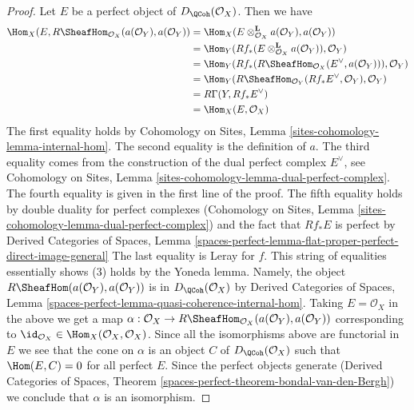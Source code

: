 \begin{proof}
\medskip\noindent
Let $E$ be a perfect object of $D_\QCoh(\mathcal{O}_X)$. Then
we have
\begin{align*}
\Hom_X(E, R\SheafHom_{\mathcal{O}_X}(a(\mathcal{O}_Y), a(\mathcal{O}_Y))
& =
\Hom_X(E \otimes_{\mathcal{O}_X}^\mathbf{L} a(\mathcal{O}_Y),
a(\mathcal{O}_Y)) \\
& =
\Hom_Y(Rf_*(E \otimes_{\mathcal{O}_X}^\mathbf{L} a(\mathcal{O}_Y)),
\mathcal{O}_Y) \\
& =
\Hom_Y(Rf_*(R\SheafHom_{\mathcal{O}_X}(E^\vee, a(\mathcal{O}_Y))),
\mathcal{O}_Y) \\
& =
\Hom_Y(R\SheafHom_{\mathcal{O}_Y}(Rf_*E^\vee, \mathcal{O}_Y),
\mathcal{O}_Y) \\
& =
R\Gamma(Y, Rf_*E^\vee) \\
& =
\Hom_X(E, \mathcal{O}_X)
\end{align*}
The first equality holds by Cohomology on Sites, Lemma
\ref{sites-cohomology-lemma-internal-hom}.
The second equality is the definition of $a$.
The third equality comes from the construction of the dual perfect
complex $E^\vee$, see Cohomology on Sites, Lemma
\ref{sites-cohomology-lemma-dual-perfect-complex}.
The fourth equality is given in the first line of the proof.
The fifth equality holds by double duality for perfect complexes
(Cohomology on Sites, Lemma
\ref{sites-cohomology-lemma-dual-perfect-complex})
and the fact that $Rf_*E$ is perfect by
Derived Categories of Spaces, Lemma
\ref{spaces-perfect-lemma-flat-proper-perfect-direct-image-general}
The last equality is Leray for $f$.
This string of equalities essentially shows (3)
holds by the Yoneda lemma. Namely, the object
$R\SheafHom(a(\mathcal{O}_Y), a(\mathcal{O}_Y))$
is in $D_\QCoh(\mathcal{O}_X)$ by Derived Categories of Spaces, Lemma
\ref{spaces-perfect-lemma-quasi-coherence-internal-hom}.
Taking $E = \mathcal{O}_X$ in the above we get a map
$\alpha : \mathcal{O}_X \to
R\SheafHom_{\mathcal{O}_X}(a(\mathcal{O}_Y), a(\mathcal{O}_Y))$
corresponding to
$\id_{\mathcal{O}_X} \in \Hom_X(\mathcal{O}_X, \mathcal{O}_X)$.
Since all the isomorphisms above are functorial in $E$ we
see that the cone on $\alpha$ is an object $C$ of $D_\QCoh(\mathcal{O}_X)$
such that $\Hom(E, C) = 0$ for all perfect $E$.
Since the perfect objects generate
(Derived Categories of Spaces, Theorem
\ref{spaces-perfect-theorem-bondal-van-den-Bergh})
we conclude that $\alpha$ is an isomorphism.
\end{proof}










